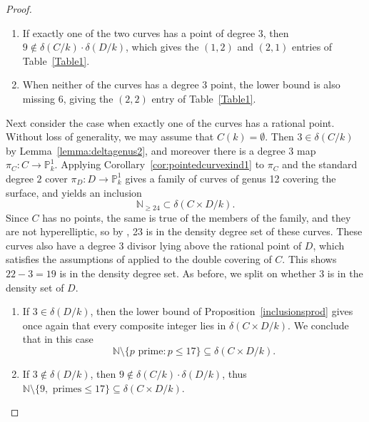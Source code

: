 \documentclass[a4paper,11pt]{amsart}
\theoremstyle{plain}
\theoremstyle{remark}
\newcommand{\nn}{\mathbb{N}}
\newcommand{\dendegs}{\delta}
\begin{document}
\begin{proof}
\begin{enumerate}
    \item If exactly one of the two curves has a point of degree $3$, then $9\not\in\dendegs(C/k)\cdot\dendegs(D/k)$, which gives the $(1,2)$ and $(2,1)$ entries of Table~\ref{Table1}.

    \item When neither of the curves has a degree $3$ point, the lower bound is also missing 6, giving the $(2,2)$ entry of Table~\ref{Table1}.
\end{enumerate}


Next consider the case when exactly one of the curves has a rational point. Without loss of generality, we may assume that $C(k)=\emptyset$. 
Then $3\in\dendegs(C/k)$ by Lemma~\ref{lemma:deltagenus2}, and moreover there is a degree $3$ map $\pi_C:C\to\mathbb{P}_k^1$. Applying Corollary~\ref{cor:pointedcurvexind1} to $\pi_C$ and the standard degree $2$ cover $\pi_D:D\to \mathbb{P}_k^1$ gives a family of curves of genus 12 covering the surface, and yields an inclusion 
\[\nn_{\geq 24}\subset\dendegs(C\times D/k).\] 
Since $C$ has no points, the same is true of the members of the family, and they are not hyperelliptic, so by , 23 is in the density degree set of these curves. These curves also have a degree 3 divisor lying above the rational point of $D$, which satisfies the assumptions of  applied to the double covering of $C$. This shows $22 - 3 = 19$ is in the density degree set.
As before, we split on whether $3$ is in the density set of $D$.
\begin{enumerate}
    \item If $3\in\dendegs(D/k)$, then the lower bound of Proposition~\ref{inclusionsprod} gives once again that every composite integer lies in $\dendegs(C\times D/k)$. We conclude that in this case \[\nn\setminus\{p \text{ prime}: p\leq 17\}\subseteq\dendegs(C\times D/k).\] 
    \item If $3\notin \dendegs(D/k)$, then $9\not\in\dendegs(C/k)\cdot\dendegs(D/k)$, thus $\nn\setminus\{9, \text{ primes}\leq 17\}\subseteq\dendegs(C\times D/k).$
\end{enumerate}


\end{proof}
\end{document}
